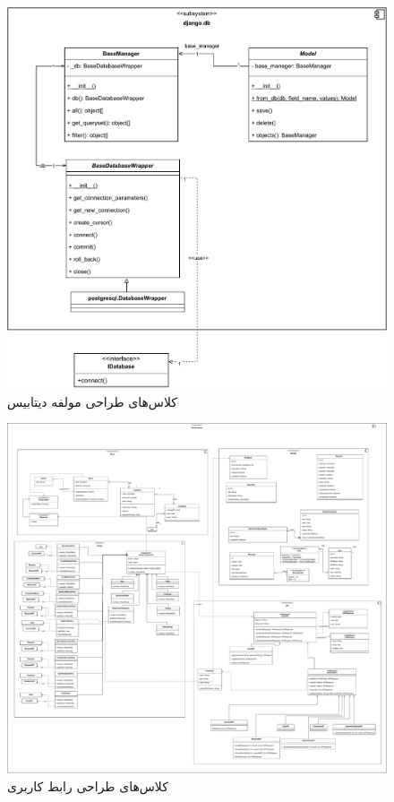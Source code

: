 \recalctypearea

\begin{figure}[ht!]
	\centering
	\includegraphics[scale=0.8]{figs/design-class/db.pdf}
	\caption{کلاس‌های طراحی مولفه دیتابیس}
\end{figure}
\FloatBarrier
\newpage

\eject \pdfpagewidth=25in \pdfpageheight=25in

\begin{figure}[ht!]
	\centering
	\includegraphics[scale=0.8]{figs/design-class/front.pdf}
	\caption{کلاس‌های طراحی رابط کاربری}
\end{figure}
\FloatBarrier
\newpage

